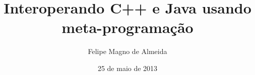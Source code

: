 \documentclass[14pt]{beamer}
\title{Interoperando C++ e Java usando meta-programação}
\author{Felipe Magno de Almeida}
\date{25 de maio de 2013}
\begin{document}
\frame
{
  \titlepage
}

\frame
{
  \tableofcontents
}
\end{document}
